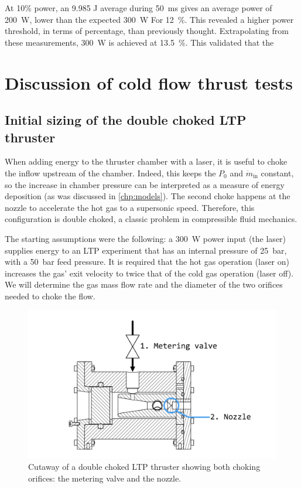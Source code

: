         At 10\% power, an 9.985 J average during \qty{50}{ms} gives an average power of \qty{200}{W}, lower than the expected \qty{300}{W} For \qty{12}{\%}. This revealed a higher power threshold, in terms of percentage, than previously thought. Extrapolating from these measurements, \qty{300}{W} is achieved at \qty{13.5}{\%}. This validated that the

\section{Discussion of cold flow thrust tests}

    \subsection{Initial sizing of the double choked LTP thruster}

            When adding energy to the thruster chamber with a laser, it is useful to choke the inflow upstream of the chamber. Indeed, this keeps the $P_0$ and $\dot{m}_\mathrm{in}$ constant, so the increase in chamber pressure can be interpreted as a measure of energy deposition (as was discussed in \autoref{chp:models}). The second choke happens at the nozzle to accelerate the hot gas to a supersonic speed. Therefore, this configuration is double choked, a classic problem in compressible fluid mechanics.
            
            The starting assumptions were the following: a \qty{300}{W} power input (the laser) supplies energy to an LTP experiment that has an internal pressure of \qty{25}{bar}, with a \qty{50}{bar} feed pressure. It is required that the hot gas operation (laser on) increases the gas' exit velocity to twice that of the cold gas operation (laser off). We will determine the gas mass flow rate and the diameter of the two orifices needed to choke the flow.

            \begin{figure}[h]
                \centering
                \includegraphics[width=0.8\linewidth]{assets/3 design/Double choked LTP thruster.pdf}
                \caption{Cutaway of a double choked LTP thruster showing both choking orifices: the metering valve and the nozzle.}
                \label{fig:double choke sizing}
            \end{figure}
            
